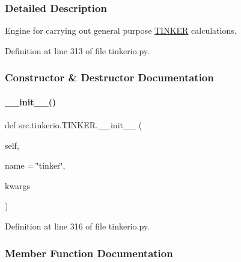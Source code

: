 \subsubsection{Detailed Description}
Engine for carrying out general purpose \hyperlink{classsrc_1_1tinkerio_1_1TINKER}{T\+I\+N\+K\+ER} calculations. 



Definition at line 313 of file tinkerio.\+py.



\subsubsection{Constructor \& Destructor Documentation}
\mbox{\label{classsrc_1_1tinkerio_1_1TINKER_afe031bd299b6941e37eb30cd1f267f0b}} 
\paragraph{\texorpdfstring{\+\_\+\+\_\+init\+\_\+\+\_\+()}{\_\_init\_\_()}}
{\footnotesize\ttfamily def src.\+tinkerio.\+T\+I\+N\+K\+E\+R.\+\_\+\+\_\+init\+\_\+\+\_\+ (\begin{DoxyParamCaption}\item[{}]{self,  }\item[{}]{name = {\ttfamily \char`\"{}tinker\char`\"{}},  }\item[{}]{kwargs }\end{DoxyParamCaption})}



Definition at line 316 of file tinkerio.\+py.



\subsubsection{Member Function Documentation}
\mbox{\label{classsrc_1_1tinkerio_1_1TINKER_ace7003bc50f5ccdc1b2b065fb886b457}} 
